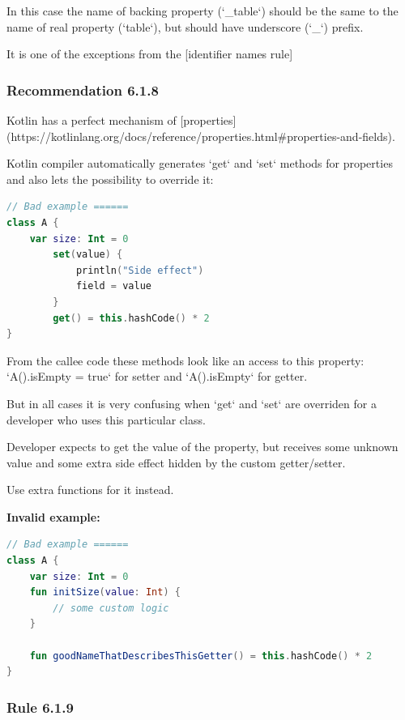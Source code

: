 {{{{In this case the name of backing property (`\_table`) should be the same to the name of real property (`table`), but should have underscore (`\_`) prefix.

It is one of the exceptions from the [identifier names rule]



\subsubsection*{\textbf{Recommendation 6.1.8}}
\leavevmode\newline

Kotlin has a perfect mechanism of [properties](https://kotlinlang.org/docs/reference/properties.html\#properties-and-fields).

Kotlin compiler automatically generates `get` and `set` methods for properties and also lets the possibility to override it:

\begin{lstlisting}[language=Kotlin]
// Bad example ======
class A {
    var size: Int = 0
        set(value) {
            println("Side effect")
            field = value
        }
        get() = this.hashCode() * 2
}
\end{lstlisting}


From the callee code these methods look like an access to this property: `A().isEmpty = true` for setter and `A().isEmpty` for getter.

But in all cases it is very confusing when `get` and `set` are overriden for a developer who uses this particular class.

Developer expects to get the value of the property, but receives some unknown value and some extra side effect hidden by the custom getter/setter.

Use extra functions for it instead.



\textbf{Invalid example:}

\begin{lstlisting}[language=Kotlin]
// Bad example ======
class A {
    var size: Int = 0
    fun initSize(value: Int) {
        // some custom logic
    }

    fun goodNameThatDescribesThisGetter() = this.hashCode() * 2
}
\end{lstlisting}


\subsubsection*{\textbf{Rule 6.1.9}}
\leavevmode\newline

}}}}
